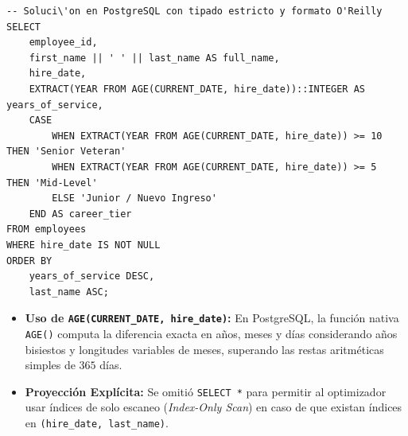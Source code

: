 \begin{lstlisting}[style=sqlstyle, caption={Consulta optimizada de c\'alculo temporal de personal}]
-- Soluci\'on en PostgreSQL con tipado estricto y formato O'Reilly
SELECT
    employee_id,
    first_name || ' ' || last_name AS full_name,
    hire_date,
    EXTRACT(YEAR FROM AGE(CURRENT_DATE, hire_date))::INTEGER AS years_of_service,
    CASE
        WHEN EXTRACT(YEAR FROM AGE(CURRENT_DATE, hire_date)) >= 10 THEN 'Senior Veteran'
        WHEN EXTRACT(YEAR FROM AGE(CURRENT_DATE, hire_date)) >= 5  THEN 'Mid-Level'
        ELSE 'Junior / Nuevo Ingreso'
    END AS career_tier
FROM employees
WHERE hire_date IS NOT NULL
ORDER BY
    years_of_service DESC,
    last_name ASC;
\end{lstlisting}

\begin{engtip}
\begin{itemize}
    \item \textbf{Uso de \texttt{AGE(CURRENT\_DATE, hire\_date)}:} En PostgreSQL, la funci\'on nativa \texttt{AGE()} computa la diferencia exacta en a\~nos, meses y d\'ias considerando a\~nos bisiestos y longitudes variables de meses, superando las restas aritm\'eticas simples de $365$ d\'ias.
    \item \textbf{Proyecci\'on Expl\'icita:} Se omiti\'o \texttt{SELECT *} para permitir al optimizador usar \'indices de solo escaneo (\textit{Index-Only Scan}) en caso de que existan \'indices en \texttt{(hire\_date, last\_name)}.
\end{itemize}
\end{engtip}
